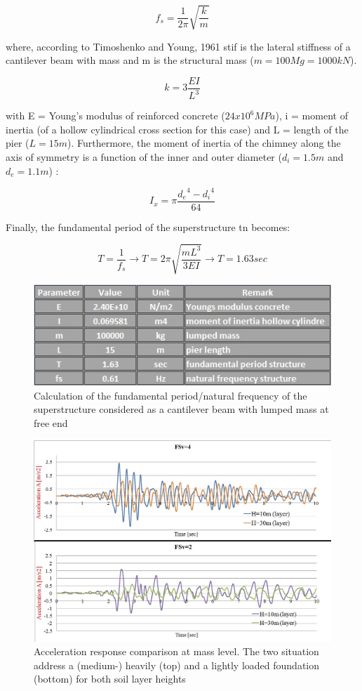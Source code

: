 \begin{equation}
	f_s=\frac{1}{2 \pi} \sqrt{\frac{k}{m}}
\end{equation}

where, according to Timoshenko and Young, 1961 \gls{stif} is the lateral stiffness of a cantilever beam with mass and m is the structural mass ($m=100 Mg=1000 kN$).

\begin{equation}
	k=3\frac{EI}{L^3}
\end{equation}

with E = Young's modulus of reinforced concrete ($24x10^6 MPa$), \gls{i} = moment of inertia (of a hollow cylindrical cross section for this case) and L = length of the pier ($L=15m$). Furthermore, the moment of inertia of the chimney along the axis of symmetry is a function of the inner and outer diameter ($d_i=1.5m$ and $d_e=1.1m$) :
 
\begin{equation}
	I_x=\pi \frac{{d_e}^4-{d_i}^4}{64}
\end{equation}

Finally, the fundamental period of the superstructure \gls{tn} becomes:

\begin{equation}
	T=\frac{1}{f_s} \longrightarrow T=2 \pi \sqrt{\frac{mL^3}{3EI}} \longrightarrow T=1.63 sec
\end{equation}

\begin{figure}[h]
	\centering
	\includegraphics[width=0.7 \linewidth]{"fundamental"}
	\caption{Calculation of the fundamental period/natural frequency of the superstructure considered as a cantilever beam with lumped mass at free end}
	\label{fundam}
\end{figure}

 \begin{figure}[h]
 	\centering
 	\includegraphics[width=0.7 \linewidth]{"acc_10m"}
 	\caption{Acceleration response comparison at mass level. The two situation address a (medium-) heavily (top) and a lightly loaded foundation (bottom) for both soil layer heights}
 	\label{10}
 \end{figure}


